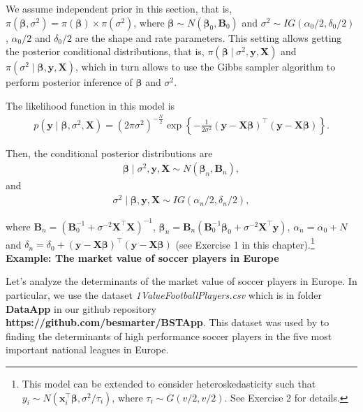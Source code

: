 We assume independent prior in this section, that is, $\pi(\bm{\beta},\sigma^2)=\pi(\bm{\beta})\times\pi(\sigma^2)$, where $\bm{\beta} \sim N(\bm{\beta}_0, {\bm{B}}_0)$ and $\sigma^2 \sim IG(\alpha_0/2, \delta_0/2)$, $\alpha_0/2$ and $\delta_0/2$ are the shape and rate parameters. This setting allows getting the posterior conditional distributions, that is, $\pi(\bm{\beta}\mid \sigma^2,{\bm{y}}, {\bm{X}})$ and $\pi(\sigma^2\mid \bm{\beta},{\bm{y}}, {\bm{X}})$, which in turn allows to use the Gibbs sampler algorithm to perform posterior inference of $\bm{\beta}$ and $\sigma^2$.

The likelihood function in this model is
\begin{align*}
	p({\bm{y}}\mid  \bm{\beta}, \sigma^2, {\bm{X}}) = (2\pi\sigma^2)^{-\frac{N}{2}} \exp \left\{-\frac{1}{2\sigma^2} ({\bm{y}} - \bm{X\bm{\beta}})^{\top}({\bm{y}} - \bm{X\bm{\beta}}) \right\}.
\end{align*}

Then, the conditional posterior distributions are
\begin{align*}
	\bm{\beta}\mid \sigma^2, {\bm{y}}, {\bm{X}} \sim N(\bm{\beta}_n, {\bm{B}}_n),
\end{align*}
and
\begin{align*}
	\sigma^2\mid \bm{\beta}, {\bm{y}}, {\bm{X}} \sim IG(\alpha_n/2, \delta_n/2),
\end{align*}

 where ${\bm{B}}_n = ({\bm{B}}_0^{-1} + \sigma^{-2} {\bm{X}}^{\top}{\bm{X}})^{-1}$, $\bm{\beta}_n= {\bm{B}}_n({\bm{B}}_0^{-1}\bm{\beta}_0 + \sigma^{-2} {\bm{X}}^{\top}{\bm{y}})$, $\alpha_n = \alpha_0 + N$ and $\delta_n = \delta_0 + ({\bm{y}}-{\bm{X}}\bm{\beta})^{\top}({\bm{y}}-{\bm{X}}\bm{\beta})$ (see Exercise 1 in this chapter).\footnote{This model can be extended to consider heteroskedasticity such that $y_i\sim N({\bm{x}}_i^{\top}\bm{\beta}, \sigma^2/\tau_i)$, where $\tau_i\sim G(v/2,v/2)$. See Exercise 2 for details.}\\

\textbf{Example: The market value of soccer players in Europe}

Let's analyze the determinants of the market value of soccer players in Europe. In particular, we use the dataset \textit{1ValueFootballPlayers.csv} which is in folder \textbf{DataApp} in our github repository \textbf{https://github.com/besmarter/BSTApp}. This dataset was used by \cite{Serna2018} to finding the determinants of high performance soccer players in the five most important national leagues in Europe.

